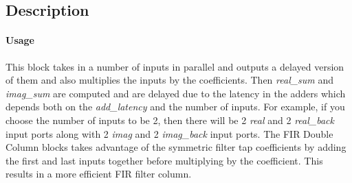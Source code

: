 \documentclass{article}
\newcommand{\BlockDesc}[1]{\subsection*{Description}#1}
\begin{document}
\BlockDesc{
\paragraph{Usage}
This block takes in a number of inputs in parallel and outputs a delayed version of them and also multiplies the inputs by the coefficients. Then \textit{real\_sum} and \textit{imag\_sum} are computed and are delayed due to the latency in the adders which depends both on the \textit{add\_latency} and the number of inputs. For example, if you choose the number of inputs to be 2, then there will be 2 \textit{real} and 2 \textit{real\_back} input ports along with 2 \textit{imag} and 2 \textit{imag\_back} input ports. The FIR Double Column blocks takes advantage of the symmetric filter tap coefficients by adding the first and last inputs together before multiplying by the coefficient. This results in a more efficient FIR filter column.
 }





 
\end{document}
